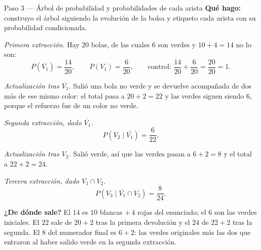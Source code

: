 \documentclass[11pt]{article}
\begin{document}
\begin{paso}{Paso 3 --- Árbol de probabilidad y probabilidades de cada arista}
\textbf{Qué hago:} construyo el árbol siguiendo la evolución de la bolsa y etiqueto cada arista con su probabilidad condicionada.

\emph{Primera extracción.} Hay $20$ bolas, de las cuales $6$ son verdes y $10+4=14$ no lo son:
\[
P(\overline{V_1})=\frac{14}{20},\qquad P(V_1)=\frac{6}{20},
\qquad\text{control: }\frac{14}{20}+\frac{6}{20}=\frac{20}{20}=1 .
\]

\emph{Actualización tras $\overline{V_1}$.} Salió una bola no verde y se devuelve acompañada de dos más de ese mismo color: el total pasa a $20+2=22$ y las verdes siguen siendo $6$, porque el refuerzo fue de un color no verde.

\emph{Segunda extracción, dado $\overline{V_1}$.}
\[
P(V_2\mid \overline{V_1})=\frac{6}{22}.
\]

\emph{Actualización tras $V_2$.} Salió verde, así que las verdes pasan a $6+2=8$ y el total a $22+2=24$.

\emph{Tercera extracción, dado $\overline{V_1}\cap V_2$.}
\[
P(V_3\mid \overline{V_1}\cap V_2)=\frac{8}{24}.
\]

\begin{center}
\end{center}

\textbf{¿De dónde sale?} El $14$ es $10$ blancas $+\,4$ rojas del enunciado; el $6$ son las verdes iniciales. El $22$ sale de $20+2$ tras la primera devolución y el $24$ de $22+2$ tras la segunda. El $8$ del numerador final es $6+2$: las verdes originales más las dos que entraron al haber salido verde en la segunda extracción.


\end{paso}
\end{document}
